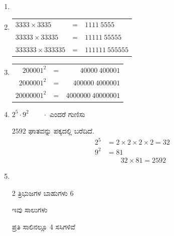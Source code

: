 \begin{enumerate}
\item
{\fontsize{5}{7}}

\item
\begin{tabular}[t]{l@{\;}c@{\;}l}
$3333\times 3335$ & = & $1111~5555$\\
$33333\times 33335$ & = & $11111~55555$\\
$333333\times 333335$ & = & $111111~555555$
\end{tabular}

\item
\begin{tabular}[t]{r@{\;}c@{\;}r}
$200001^{2}$ & = & $40000~400001$\\
$2000001^{2}$ & = & $400000~4000001$\\
$20000001^{2}$ & = & $4000000~40000001$
\end{tabular}

\item $2^{5} \cdot 9^{2}\qquad \cdot$ ಎಂದರೆ ಗುಣಿಸು

$2592$ ಘಾತವನ್ನು ಪಕ್ಕದಲ್ಲಿ ಬರೆದಿದೆ. 
\begin{align*}
2^{5} & = 2\times 2\times 2\times 2 = 32\\
9^{2} & = 81\\
& \qquad 32\times 81 = 2592
\end{align*}

\item
~

\begin{minipage}[c]{4cm}
2 ತ್ರಿಭುಜಗಳ ಬಾಹುಗಳು 6 

ಇವು ಸಾಲುಗಳು 

ಪ್ರತಿ ಸಾಲಿನಲ್ಲೂ 4 ಸಸಿಗಳಿವೆ 


\end{minipage}
\end{enumerate}
